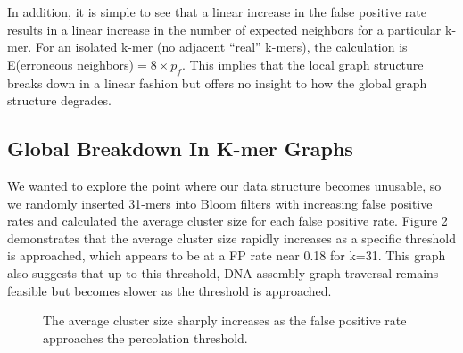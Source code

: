 \documentclass[12pt]{article} \usepackage{simplemargins}
\begin{document}
In addition, it is simple to see that a linear increase in the false 
positive rate results in a linear increase in the number of expected 
neighbors for a particular k-mer. For an isolated k-mer (no adjacent 
``real'' k-mers), the calculation is 
E(erroneous neighbors)$ = 8 \times p_f$. This implies that the local graph 
structure breaks down in a linear fashion but offers no insight 
to how the global graph structure degrades.

\subsection{Global Breakdown In K-mer Graphs}
We wanted to explore the point where our data structure becomes unusable, 
so we randomly inserted 31-mers into Bloom
filters with increasing false positive rates and calculated the average
cluster size for each false positive rate. Figure 2 demonstrates that 
the average cluster
size rapidly increases as a specific threshold is approached,
which appears to be at a FP rate near 0.18 for k=31. This
graph also suggests that up to this threshold, DNA assembly graph 
traversal remains feasible but becomes slower as the threshold is
approached.

\begin{figure}
\caption{The average cluster size sharply increases as the false positive 
rate approaches the percolation threshold.
}
\end{figure}
\end{document}

